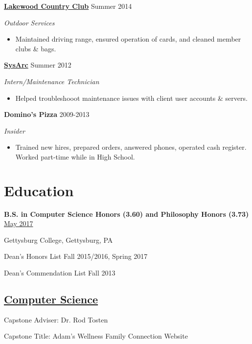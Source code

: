 \documentclass[11pt]{article}
\begin{document}
\textbf{\href{http://www.lakewoodcc.org/}{Lakewood Country Club}}
\hfill
Summer 2014

\textit{Outdoor Services}

\begin{itemize}
\item Maintained driving range, ensured operation of cards, and cleaned member clubs \& bags.\\
\end{itemize}

\textbf{\href{http://www.sysarc.com/}{SysArc}}
\hfill
Summer 2012

\textit{Intern/Maintenance Technician}

\begin{itemize}
\item  Helped troubleshooot maintenance issues with client user accounts \& servers.\\
\end{itemize}

\textbf{Domino's Pizza}
\hfill
2009-2013

\textit{Insider}

\begin{itemize}
\item  Trained new hires, prepared orders, answered phones, operated cash register. Worked part-time while in High School.
\end{itemize}

\section*{Education}
\textbf{B.S. in Computer Science {\footnotesize Honors (3.60)} and Philosophy {\footnotesize Honors (3.73)}}
\hfill
\href{https://www.gettysburg.edu/commencement/2017/pdfs/2017\%20Commencement\%20Program\%20FINAL.pdf}{May 2017}

Gettysburg College, Gettysburg, PA

Dean's Honors List \hfill Fall 2015/2016, Spring 2017

Dean's Commendation List \hfill Fall 2013

\subsection*{\underline{Computer Science}}

Capstone Adviser: Dr. Rod Tosten

Capstone Title: Adam's Wellness Family Connection Website
\end{document}
